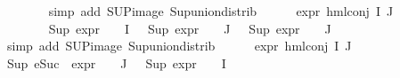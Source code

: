 \begin{isabellebody}
\ \ \ \ \ \ \isamarkupfalse%
\ {\isacharparenleft}{\kern0pt}simp\ add{\isacharcolon}{\kern0pt}\ SUP{\isacharunderscore}{\kern0pt}image\ Sup{\isacharunderscore}{\kern0pt}union{\isacharunderscore}{\kern0pt}distrib{\isacharparenright}{\kern0pt}\isanewline
\ \ \ \ \isamarkupfalse%
\ {\isachardoublequoteopen}expr{\isacharunderscore}{\kern0pt}{}\ {\isacharparenleft}{\kern0pt}hml{\isacharunderscore}{\kern0pt}conj\ I\ J\ {\isasymPhi}{\isacharparenright}{\kern0pt}\ {\isasymle}\ {}{\isachardoublequoteclose}\isanewline
\ \ \ \ \ \ \isamarkupfalse%
\ {\isacartoucheopen}Sup\ {\isacharparenleft}{\kern0pt}{\isacharparenleft}{\kern0pt}expr{\isacharunderscore}{\kern0pt}{}\ {\isasymcirc}\ {\isasymPhi}{\isacharparenright}{\kern0pt}\ {\isacharbackquote}{\kern0pt}\ I{\isacharparenright}{\kern0pt}\ {\isasymle}\ {}{\isacartoucheclose}\ {\isacartoucheopen}Sup\ {\isacharparenleft}{\kern0pt}{\isacharparenleft}{\kern0pt}expr{\isacharunderscore}{\kern0pt}{}\ {\isasymcirc}\ {\isasymPhi}{\isacharparenright}{\kern0pt}\ {\isacharbackquote}{\kern0pt}\ J{\isacharparenright}{\kern0pt}\ {\isasymle}\ {}{\isacartoucheclose}\ {\isacartoucheopen}Sup\ {\isacharparenleft}{\kern0pt}{\isacharparenleft}{\kern0pt}expr{\isacharunderscore}{\kern0pt}{}\ {\isasymcirc}\ {\isasymPhi}{\isacharparenright}{\kern0pt}\ {\isacharbackquote}{\kern0pt}\ J{\isacharparenright}{\kern0pt}\ {\isasymle}\ {}{\isacartoucheclose}\isanewline
\ \ \ \ \ \ \isamarkupfalse%
\ {\isacharparenleft}{\kern0pt}simp\ add{\isacharcolon}{\kern0pt}\ SUP{\isacharunderscore}{\kern0pt}image\ Sup{\isacharunderscore}{\kern0pt}union{\isacharunderscore}{\kern0pt}distrib{\isacharparenright}{\kern0pt}\isanewline
\ \ \ \ \isamarkupfalse%
\ {\isachardoublequoteopen}expr{\isacharunderscore}{\kern0pt}{}\ {\isacharparenleft}{\kern0pt}hml{\isacharunderscore}{\kern0pt}conj\ I\ J\ {\isasymPhi}{\isacharparenright}{\kern0pt}\ {\isasymle}\ {}{\isachardoublequoteclose}\isanewline
\ \ \ \ \ \ \isamarkupfalse%
\ {\isacartoucheopen}Sup\ {\isacharparenleft}{\kern0pt}{\isacharparenleft}{\kern0pt}eSuc\ {\isasymcirc}\ expr{\isacharunderscore}{\kern0pt}{}\ {\isasymcirc}\ {\isasymPhi}{\isacharparenright}{\kern0pt}\ {\isacharbackquote}{\kern0pt}\ J{\isacharparenright}{\kern0pt}\ {\isasymle}\ {}{\isacartoucheclose}\ {\isacartoucheopen}Sup\ {\isacharparenleft}{\kern0pt}{\isacharparenleft}{\kern0pt}expr{\isacharunderscore}{\kern0pt}{}\ {\isasymcirc}\ {\isasymPhi}{\isacharparenright}{\kern0pt}\ {\isacharbackquote}{\kern0pt}\ I{\isacharparenright}{\kern0pt}\ {\isasymle}\ {}{\isacartoucheclose}\isanewline

\end{isabellebody}
